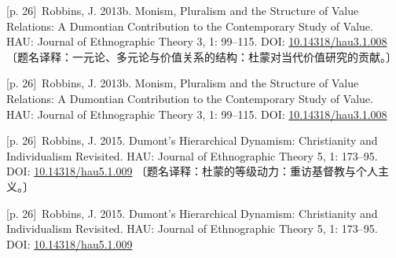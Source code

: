 \documentclass[10pt,a4paper]{article}
\begin{document}
\noindent\begin{minipage}{\textwidth}\begin{minipage}[t]{\dimexpr.5\textwidth-4mm\relax}\noindent\begin{minipage}[t]{\linewidth}{\scriptsize\color{gray} [p. 26]}\ Robbins, J. 2013b. Monism, Pluralism and the Structure of Value Relations: A Dumontian Contribution to the Contemporary Study of Value. HAU: Journal of Ethnographic Theory 3, 1: 99–115. DOI: \url{10.14318/hau3.1.008} 〔题名译释：一元论、多元论与价值关系的结构：杜蒙对当代价值研究的贡献。〕\par\end{minipage}\par\end{minipage}\hfill\begin{minipage}[t]{\dimexpr.5\textwidth-4mm\relax}\noindent\begin{minipage}[t]{\linewidth}{\scriptsize\color{gray} [p. 26]}\ Robbins, J. 2013b. Monism, Pluralism and the Structure of Value Relations: A Dumontian Contribution to the Contemporary Study of Value. HAU: Journal of Ethnographic Theory 3, 1: 99–115. DOI: \url{10.14318/hau3.1.008}\par\end{minipage}\par\end{minipage}\end{minipage}\par
\noindent\begin{minipage}{\textwidth}\begin{minipage}[t]{\dimexpr.5\textwidth-4mm\relax}\noindent\begin{minipage}[t]{\linewidth}{\scriptsize\color{gray} [p. 26]}\ Robbins, J. 2015. Dumont’s Hierarchical Dynamism: Christianity and Individualism Revisited. HAU: Journal of Ethnographic Theory 5, 1: 173–95. DOI: \url{10.14318/hau5.1.009} 〔题名译释：杜蒙的等级动力：重访基督教与个人主义。〕\par\end{minipage}\par\end{minipage}\hfill\begin{minipage}[t]{\dimexpr.5\textwidth-4mm\relax}\noindent\begin{minipage}[t]{\linewidth}{\scriptsize\color{gray} [p. 26]}\ Robbins, J. 2015. Dumont’s Hierarchical Dynamism: Christianity and Individualism Revisited. HAU: Journal of Ethnographic Theory 5, 1: 173–95. DOI: \url{10.14318/hau5.1.009}\par\end{minipage}\par\end{minipage}\end{minipage}\par
\end{document}
